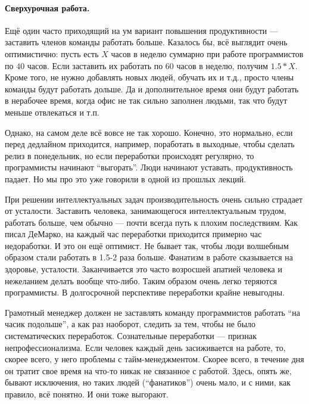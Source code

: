 \documentclass{../../text-style}
\begin{document}
\paragraph{Сверхурочная работа.} Ещё один часто приходящий на ум вариант повышения продуктивности --- заставить членов команды работать больше. Казалось бы, всё выглядит очень оптимистично: пусть есть $X$ часов в неделю суммарно при работе программистов по $40$ часов. Если заставить их работать по $60$ часов в неделю, получим $1.5 * X$. Кроме того, не нужно добавлять новых людей, обучать их и т.д., просто члены команды будут работать дольше. Да и дополнительное время они будут работать в нерабочее время, когда офис не так сильно заполнен людьми, так что будут меньше отвлекаться и т.п.

Однако, на самом деле всё вовсе не так хорошо. Конечно, это нормально, если перед дедлайном приходится, например, поработать в выходные, чтобы сделать релиз в понедельник, но если переработки происходят регулярно, то программисты начинают \enquote{выгорать}. Люди начинают уставать, продуктивность падает. Но мы про это уже говорили в одной из прошлых лекций.

При решении интеллектуальных задач производительность очень сильно страдает от усталости. Заставить человека, занимающегося интеллектуальным трудом, работать больше, чем обычно --- почти всегда путь к плохим последствиям. Как писал ДеМарко, на каждый час переработки приходится примерно час недоработки. И это он ещё оптимист. Не бывает так, чтобы люди волшебным образом стали работать в 1.5-2 раза больше. Фанатизм в работе сказывается на здоровье, усталости. Заканчивается это часто возросшей апатией человека и нежеланием делать вообще что-либо. Таким образом очень легко теряются программисты. В долгосрочной перспективе переработки крайне невыгодны.

Грамотный менеджер должен не заставлять команду программистов работать \enquote{на часик подольше}, а как раз наоборот, следить за тем, чтобы не было систематических переработок. Сознательные переработки --- признак непрофессионализма. Если человек каждый день засиживается на работе, то, скорее всего, у него проблемы с тайм-менеджментом. Скорее всего, в течение дня он тратит свое время на что-то никак не связанное с работой. Здесь, опять же, бывают исключения, но таких людей (\enquote{фанатиков}) очень мало, и с ними, как правило, всё понятно. И они тоже выгорают.
\end{document}
